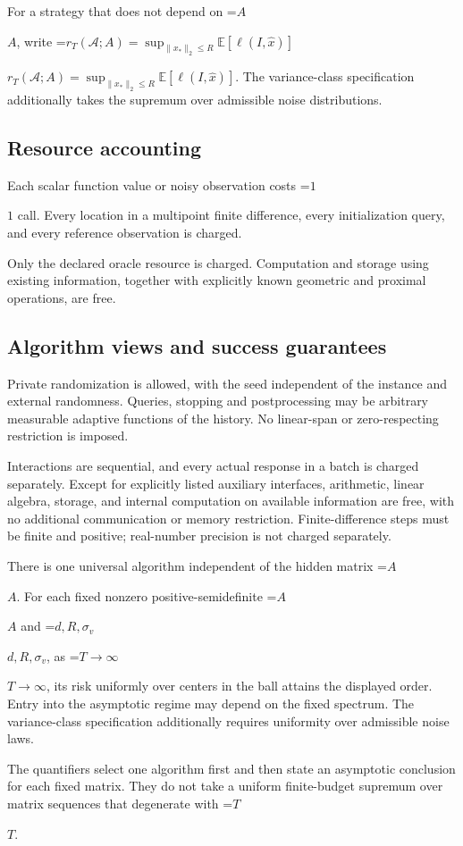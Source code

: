 \documentclass[10pt,a4paper]{article}
\newcommand{\AtlasMath}[1]{\par\begingroup\centering\setbox0=\hbox{$\displaystyle #1$}\ifdim\wd0>1.4\linewidth\typeout{ATLAS WIDE FORMULA: \the\wd0}\fi\ifdim\wd0>\linewidth\resizebox{\linewidth}{!}{\box0}\else\box0\fi\par\endgroup}
\newcommand{\AtlasInlineMath}[1]{\begingroup\setbox0=\hbox{$#1$}\ifdim\wd0>.4\linewidth\endgroup\AtlasMath{#1}\else\endgroup$#1$\fi}
\begin{document}
For a strategy that does not depend on \AtlasInlineMath{A}, write \AtlasInlineMath{r_T(\mathcal{A};A)=\sup_{\|x_*\|_2\le R}\mathbb{E}[\ell(I,\widehat{x})]}. The variance-class specification additionally takes the supremum over admissible noise distributions.

\subsection{Resource accounting}
Each scalar function value or noisy observation costs \AtlasInlineMath{1} call. Every location in a multipoint finite difference, every initialization query, and every reference observation is charged.

Only the declared oracle resource is charged. Computation and storage using existing information, together with explicitly known geometric and proximal operations, are free.

\subsection{Algorithm views and success guarantees}
Private randomization is allowed, with the seed independent of the instance and external randomness. Queries, stopping and postprocessing may be arbitrary measurable adaptive functions of the history. No linear-span or zero-respecting restriction is imposed.

Interactions are sequential, and every actual response in a batch is charged separately. Except for explicitly listed auxiliary interfaces, arithmetic, linear algebra, storage, and internal computation on available information are free, with no additional communication or memory restriction. Finite-difference steps must be finite and positive; real-number precision is not charged separately.

There is one universal algorithm independent of the hidden matrix \AtlasInlineMath{A}. For each fixed nonzero positive-semidefinite \AtlasInlineMath{A} and \AtlasInlineMath{d,R,\sigma_v}, as \AtlasInlineMath{T\to\infty}, its risk uniformly over centers in the ball attains the displayed order. Entry into the asymptotic regime may depend on the fixed spectrum. The variance-class specification additionally requires uniformity over admissible noise laws.

The quantifiers select one algorithm first and then state an asymptotic conclusion for each fixed matrix. They do not take a uniform finite-budget supremum over matrix sequences that degenerate with \AtlasInlineMath{T}.
\end{document}
